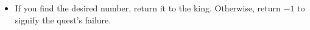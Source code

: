 \begin{itemize}
    \item If you find the desired number, return it to the king. Otherwise, return $-1$ to signify the quest's failure.
\end{itemize}